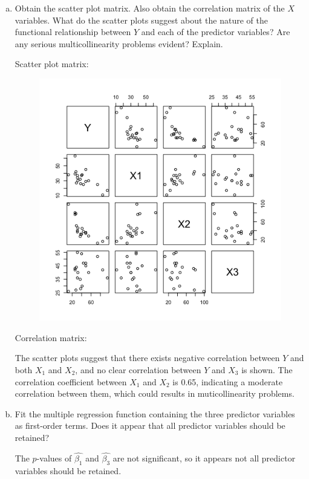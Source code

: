 \documentclass[10pt]{report}
\begin{document}
\begin{enumerate}[a.]
	\item 
	Obtain the scatter plot matrix. Also obtain the correlation matrix of the $X$ variables. What do the scatter plots suggest about the nature of the functional relationship between $Y$ and each of the predictor variables? Are any serious multicollinearity problems evident? Explain.
	
	Scatter plot matrix:
	\begin{figure}[H]
		\centering
		\vspace{-4ex}
		\includegraphics[width=.5\linewidth]{p1/13b.png}
		\vspace{-5ex}
	\end{figure}
	Correlation matrix:
	
	The scatter plots suggest that there exists negative correlation between $Y$ and both $X_1$ and $X_2$, and no clear correlation between $Y$ and $X_3$ is shown. The correlation coefficient between $X_1$ and $X_2$ is 0.65, indicating a moderate correlation between them, which could results in muticollinearity problems.
	
	\item 
	Fit the multiple regression function containing the three predictor variables as first-order terms. Does it appear that all predictor variables should be retained?
	
	The $p$-values of $\hat{\beta_1}$ and $\hat{\beta_3}$ are not significant, so it appears not all predictor variables should be retained.
\end{enumerate}
\end{document}
